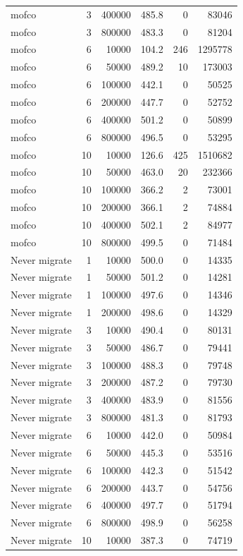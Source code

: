 \begin{table}[h]
\begin{tabular}{@{}lrrrrr@{}}
mofco & 3 & 400000 & 485.8 & 0 & 83046 \\
mofco & 3 & 800000 & 483.3 & 0 & 81204 \\
mofco & 6 & 10000 & 104.2 & 246 & 1295778 \\
mofco & 6 & 50000 & 489.2 & 10 & 173003 \\
mofco & 6 & 100000 & 442.1 & 0 & 50525 \\
mofco & 6 & 200000 & 447.7 & 0 & 52752 \\
mofco & 6 & 400000 & 501.2 & 0 & 50899 \\
mofco & 6 & 800000 & 496.5 & 0 & 53295 \\
mofco & 10 & 10000 & 126.6 & 425 & 1510682 \\
mofco & 10 & 50000 & 463.0 & 20 & 232366 \\
mofco & 10 & 100000 & 366.2 & 2 & 73001 \\
mofco & 10 & 200000 & 366.1 & 2 & 74884 \\
mofco & 10 & 400000 & 502.1 & 2 & 84977 \\
mofco & 10 & 800000 & 499.5 & 0 & 71484 \\
Never migrate & 1 & 10000 & 500.0 & 0 & 14335 \\
Never migrate & 1 & 50000 & 501.2 & 0 & 14281 \\
Never migrate & 1 & 100000 & 497.6 & 0 & 14346 \\
Never migrate & 1 & 200000 & 498.6 & 0 & 14329 \\
Never migrate & 3 & 10000 & 490.4 & 0 & 80131 \\
Never migrate & 3 & 50000 & 486.7 & 0 & 79441 \\
Never migrate & 3 & 100000 & 488.3 & 0 & 79748 \\
Never migrate & 3 & 200000 & 487.2 & 0 & 79730 \\
Never migrate & 3 & 400000 & 483.9 & 0 & 81556 \\
Never migrate & 3 & 800000 & 481.3 & 0 & 81793 \\
Never migrate & 6 & 10000 & 442.0 & 0 & 50984 \\
Never migrate & 6 & 50000 & 445.3 & 0 & 53516 \\
Never migrate & 6 & 100000 & 442.3 & 0 & 51542 \\
Never migrate & 6 & 200000 & 443.7 & 0 & 54756 \\
Never migrate & 6 & 400000 & 497.7 & 0 & 51794 \\
Never migrate & 6 & 800000 & 498.9 & 0 & 56258 \\
Never migrate & 10 & 10000 & 387.3 & 0 & 74719 \\

\end{tabular}
\end{table}
